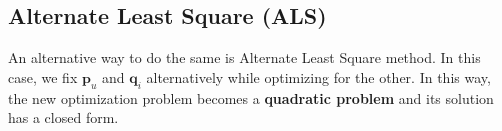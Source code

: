 \subsection{Alternate Least Square (ALS)}
An alternative way to do the same is Alternate Least Square method.\newline\newline
In this case, we fix $\textbf{p}_{u}$ and $\textbf{q}_{i}$ alternatively while optimizing for the other. In this way, the new optimization problem becomes a \textbf{quadratic problem} and its solution has a closed form.


